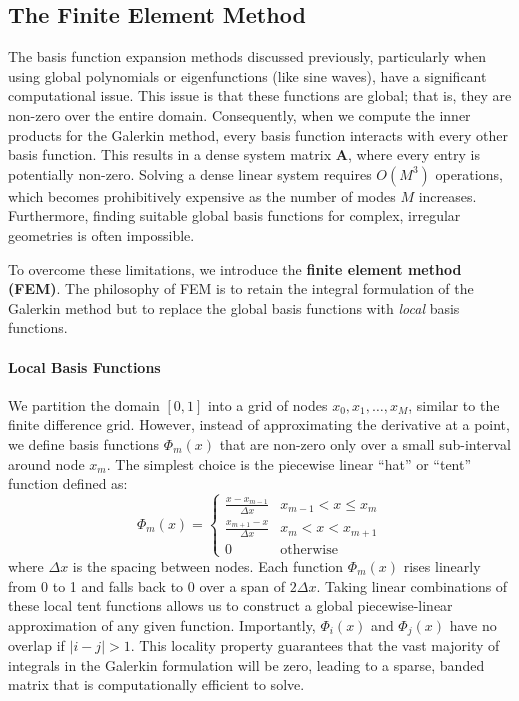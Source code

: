 \subsection{The Finite Element Method}

The basis function expansion methods discussed previously, particularly when using global polynomials or eigenfunctions (like sine waves), have a significant computational issue. This issue is that these functions are global; that is, they are non-zero over the entire domain. Consequently, when we compute the inner products for the Galerkin method, every basis function interacts with every other basis function. This results in a dense system matrix $\mathbf{A}$, where every entry is potentially non-zero. Solving a dense linear system requires $O(M^3)$ operations, which becomes prohibitively expensive as the number of modes $M$ increases. Furthermore, finding suitable global basis functions for complex, irregular geometries is often impossible.

To overcome these limitations, we introduce the \textbf{finite element method (FEM)}. The philosophy of FEM is to retain the integral formulation of the Galerkin method but to replace the global basis functions with \textit{local} basis functions.

\paragraph*{Local Basis Functions}

We partition the domain $[0, 1]$ into a grid of nodes $x_0, x_1, \dots, x_M$, similar to the finite difference grid. However, instead of approximating the derivative at a point, we define basis functions $\Phi_m(x)$ that are non-zero only over a small sub-interval around node $x_m$. The simplest choice is the piecewise linear ``hat'' or ``tent'' function defined as:
\begin{equation}
    \Phi_m(x) = \begin{cases} 
      \frac{x - x_{m-1}}{\Delta x} & x_{m-1} < x \le x_m \\
      \frac{x_{m+1} - x}{\Delta x} & x_m < x < x_{m+1} \\
      0 & \text{otherwise} 
   \end{cases}
\end{equation}
where $\Delta x$ is the spacing between nodes. Each function $\Phi_m(x)$ rises linearly from 0 to 1 and falls back to 0 over a span of $2\Delta x$. Taking linear combinations of these local tent functions allows us to construct a global piecewise-linear approximation of any given function. Importantly, $\Phi_i(x)$ and $\Phi_j(x)$ have no overlap if $|i - j| > 1$. This locality property guarantees that the vast majority of integrals in the Galerkin formulation will be zero, leading to a sparse, banded matrix that is computationally efficient to solve.

